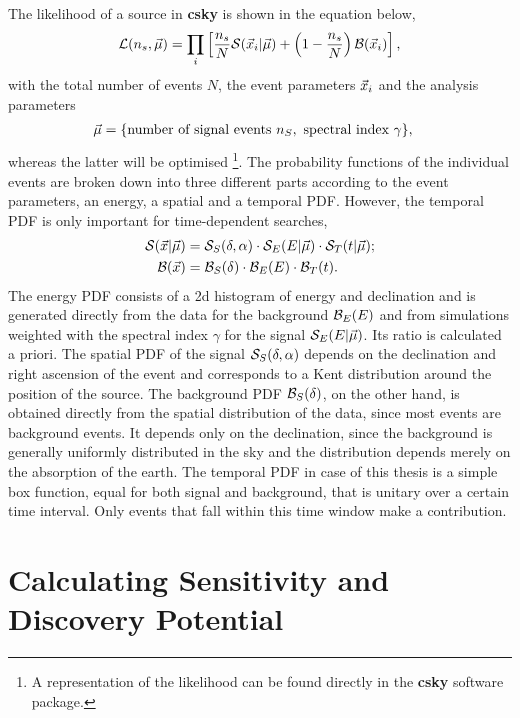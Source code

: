 The likelihood of a source in \textbf{csky} is shown in the equation below,
\begin{equation}
  \mathcal{L}(n_s,\vec{\mu})
  = \prod_i \left[ 
    \frac{n_s}{N} \mathcal{S}(\vec{x}_i|\vec{\mu})
    + \left( 1 - \frac{n_s}{N} \right) \mathcal{B}(\vec{x}_i)
   \right],
  \label{eq:lh}
\end{equation}
with the total number of events $N$, the event parameters $\vec{x}_i$ and the analysis parameters
\begin{align}
  \vec{\mu} &= \{\text{number of signal events }n_S, \text{ spectral index }\gamma\},
\end{align}
whereas the latter will be optimised \footnote{A representation of the likelihood can be found directly in the \textbf{csky} software package.}.
The probability functions of the individual events are broken down into three different parts according to the event parameters, an energy, a spatial and a temporal PDF.
However, the temporal PDF is only important for time-dependent searches,
\begin{align}
  \mathcal{S}(\vec{x}|\vec{\mu})
  &= \mathcal{S}_S(\delta,\alpha)
  \cdot \mathcal{S}_E(E|\vec{\mu})
  \cdot \mathcal{S}_T(t|\vec{\mu});
  \\
  \mathcal{B}(\vec{x})
  &= \mathcal{B}_S(\delta)
  \cdot \mathcal{B}_E(E)
  \cdot \mathcal{B}_T(t).
  \label{eq:pdf}
\end{align}
The energy PDF consists of a 2d histogram of energy and declination and is generated directly from the data for the background $\mathcal{B}_E(E)$ and from simulations weighted with the spectral index $\gamma$ for the signal $\mathcal{S}_E(E|\vec{\mu})$.
Its ratio is calculated a priori.
The spatial PDF of the signal $\mathcal{S}_S(\delta,\alpha)$ depends on the declination and right ascension of the event and corresponds to a Kent distribution around the position of the source.
The background PDF $\mathcal{B}_S(\delta)$, on the other hand, is obtained directly from the spatial distribution of the data, since most events are background events.
It depends only on the declination, since the background is generally uniformly distributed in the sky and the distribution depends merely on the absorption of the earth.
The temporal PDF in case of this thesis is a simple box function, equal for both signal and background, that is unitary over a certain time interval.
Only events that fall within this time window make a contribution.

\section{Calculating Sensitivity and Discovery Potential}

